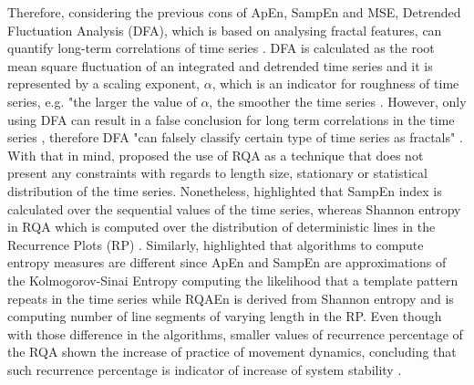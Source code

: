 Therefore, considering the previous cons of ApEn, SampEn and MSE, Detrended 
Fluctuation Analysis (DFA), which is based on analysing fractal features, 
can quantify long-term correlations of time series \citep{peng1995}.
DFA is calculated as the root mean square fluctuation of an integrated 
and detrended time series and it is represented by a scaling exponent, 
$\alpha$, which is an indicator for roughness of time series,
e.g. "the larger the value of $\alpha$, the smoother the time series 
\citep[p. 83]{peng1995}.
However, only using  DFA can result in a false conclusion for long term 
correlations in the time series \cite[p. 5001]{rangarajan2000}, therefore 
DFA "can falsely classify certain type of time series as fractals" 
\cite[p. 80]{wijnants2009}.
With that in mind, \cite{wijnants2009} proposed the use of RQA as a 
technique that does not present any constraints with regards to length size,
stationary or statistical distribution of the time series.
Nonetheless, \cite{wijnants2009} highlighted that  SampEn index is calculated 
over the sequential values of the time series, whereas Shannon entropy in 
RQA which is computed over the distribution of deterministic lines in 
the Recurrence Plots (RP) \citep{marwan2008, trulla1996, zbilut1992}.
Similarly, \cite{rhea2011} highlighted that algorithms to compute entropy 
measures are different since ApEn and SampEn are approximations of the 
Kolmogorov-Sinai Entropy computing the likelihood that a template pattern 
repeats in the time series while RQAEn is derived from Shannon entropy 
and is computing number of line segments of varying length in the RP.
Even though with those difference in the algorithms, smaller values of 
recurrence percentage of the RQA shown the increase of practice of movement
dynamics, concluding that such recurrence percentage is indicator of 
increase of system stability \citep{wijnants2009}.







